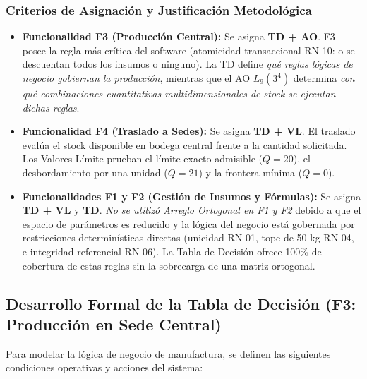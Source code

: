 \documentclass[11pt,a4paper]{article}
\begin{document}
\subsubsection{Criterios de Asignación y Justificación Metodológica}
\begin{itemize}
    \item \textbf{Funcionalidad F3 (Producción Central):} Se asigna \textbf{TD + AO}. F3 posee la regla más crítica del software (atomicidad transaccional RN-10: o se descuentan todos los insumos o ninguno). La TD define \textit{qué reglas lógicas de negocio gobiernan la producción}, mientras que el AO $L_9(3^4)$ determina \textit{con qué combinaciones cuantitativas multidimensionales de stock se ejecutan dichas reglas}.
    \item \textbf{Funcionalidad F4 (Traslado a Sedes):} Se asigna \textbf{TD + VL}. El traslado evalúa el stock disponible en bodega central frente a la cantidad solicitada. Los Valores Límite prueban el límite exacto admisible ($Q=20$), el desbordamiento por una unidad ($Q=21$) y la frontera mínima ($Q=0$).
    \item \textbf{Funcionalidades F1 y F2 (Gestión de Insumos y Fórmulas):} Se asigna \textbf{TD + VL} y \textbf{TD}. \textit{No se utilizó Arreglo Ortogonal en F1 y F2} debido a que el espacio de parámetros es reducido y la lógica del negocio está gobernada por restricciones determinísticas directas (unicidad RN-01, tope de 50 kg RN-04, e integridad referencial RN-06). La Tabla de Decisión ofrece 100\% de cobertura de estas reglas sin la sobrecarga de una matriz ortogonal.
\end{itemize}

\subsection{Desarrollo Formal de la Tabla de Decisión (F3: Producción en Sede Central)}
Para modelar la lógica de negocio de manufactura, se definen las siguientes condiciones operativas y acciones del sistema:
\end{document}
